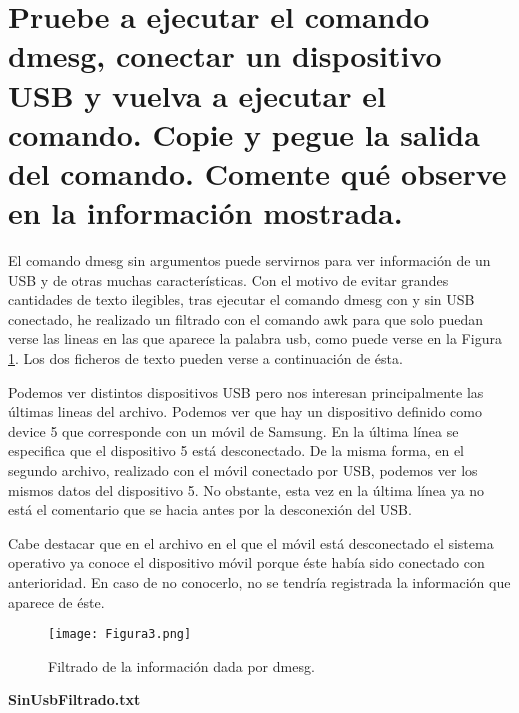\section{Pruebe a ejecutar el comando dmesg, conectar un dispositivo USB y vuelva a ejecutar el comando. Copie y pegue la salida del comando. Comente qué observe en la información mostrada.}

El comando dmesg\cite{dmesgman} sin argumentos puede servirnos para ver información de un USB y de otras muchas características.  
Con el motivo de evitar grandes cantidades de texto ilegibles, tras ejecutar el comando dmesg con y sin USB conectado, he realizado un filtrado con el comando awk
para que solo puedan verse las lineas en las que aparece la palabra usb, como puede verse en la Figura \ref{fig:figura3}. Los dos ficheros de texto pueden verse a 
continuación de ésta.

Podemos ver distintos dispositivos USB pero nos interesan principalmente las últimas lineas del archivo. Podemos ver que hay un dispositivo definido como device 5
que corresponde con un móvil de Samsung. En la última línea se especifica que el dispositivo 5 está desconectado. De la misma forma, en el segundo archivo, 
realizado con el móvil conectado por USB, podemos ver los mismos datos del dispositivo 5. No obstante, esta vez en la última línea ya no está el comentario que se
hacia antes por la desconexión del USB. 

\vspace{5mm}

Cabe destacar que en el archivo en el que el móvil está desconectado el sistema operativo ya conoce el dispositivo móvil porque éste había sido conectado con 
anterioridad. En caso de no conocerlo, no se tendría registrada la información que aparece de éste.

\begin{figure}[H] 
\centering
\texttt{[image: Figura3.png]}  
\caption{Filtrado de la información dada por dmesg.}\label{fig:figura3}
\end{figure}

\textbf{SinUsbFiltrado.txt}


